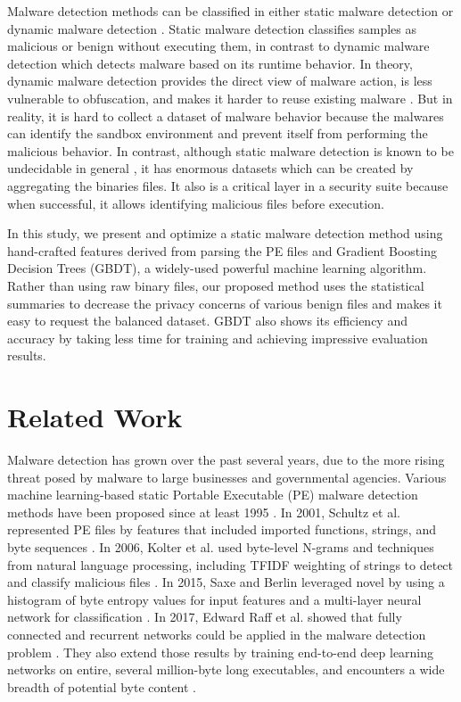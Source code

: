 \documentclass[runningheads]{llncs}
\begin{document}
Malware detection methods can be classified in either static malware detection or dynamic malware detection \cite{egele2012survey}. 
Static malware detection classifies samples as malicious or benign without executing them, in contrast to dynamic malware detection which detects malware based on its runtime behavior. 
In theory, dynamic malware detection provides the direct view of malware action, is less vulnerable to obfuscation, and makes it harder to reuse existing malware \cite{moser2007limits}. 
But in reality, it is hard to collect a dataset of malware behavior because the malwares can identify the sandbox environment and prevent itself from performing the malicious behavior. 
In contrast, although static malware detection is known to be undecidable in general \cite{cohen1987computer}, it has enormous datasets which can be created by aggregating the binaries files. It also is a critical layer in a security suite because when successful, it allows identifying malicious files before execution.

In this study, we present and optimize a static malware detection method using hand-crafted features derived from parsing the PE files and Gradient Boosting Decision Trees (GBDT), a widely-used powerful machine learning algorithm.
Rather than using raw binary files, our proposed method uses the statistical summaries to decrease the privacy concerns of various benign files and makes it easy to request the balanced dataset. 
GBDT also shows its efficiency and accuracy by taking less time for training and achieving impressive evaluation results.

\section{Related Work}

Malware detection has grown over the past several years, due to the more rising threat posed by malware to large businesses and governmental agencies. 
Various machine learning-based static Portable Executable (PE) malware detection methods have been proposed since at least 1995 \cite{kephart1995biologically,schultz2001data,kolter2006learning,saxe2015deep,raff2017malware}. 
In 2001, Schultz et al. represented PE files by features that included imported functions, strings, and byte sequences \cite{schultz2001data}. In 2006, Kolter et al. used byte-level N-grams and techniques from natural language processing, including TFIDF weighting of strings to detect and classify malicious files \cite{kolter2006learning}. In 2015, Saxe and Berlin leveraged novel by using a histogram of byte entropy values for input features and a multi-layer neural network for classification \cite{saxe2015deep}. In 2017, Edward Raff et al. showed that fully connected and recurrent networks could be applied in the malware detection problem \cite{raff2017learning}. They also extend those results by training end-to-end deep learning networks on entire, several million-byte long executables, and encounters a wide breadth of potential byte content \cite{raff2017malware}.
\end{document}
